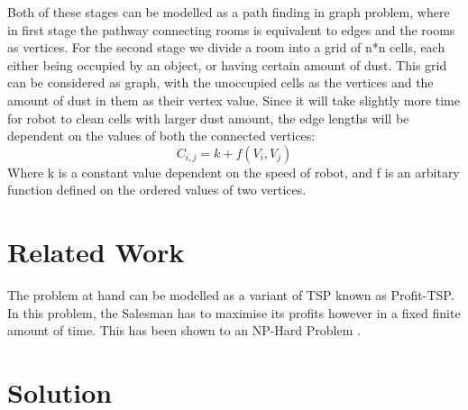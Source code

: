 \documentclass{article}
\newcommand{\Ait}{\ensuremath{A_{i \rightarrow t}}}
\newcommand{\Ati}{\ensuremath{A_{t \rightarrow i}}}
\newcommand{\Eti}{\ensuremath{E_{t \rightarrow i}}}
\newcommand{\Dti}{\ensuremath{D_{t \rightarrow i}}}
\newcommand{\Dtr}{\ensuremath{D^{(tr)}}}
\newcommand{\Dval}{\ensuremath{D^{(val)}}}
\newcommand{\TsoA}{\ensuremath{T^*(\Ati, \Ait)}}
\newcommand{\Ov}{\ensuremath{O_{i \rightarrow t}}}
\newcommand{\OsoA}{\ensuremath{\Ov^*(\Ait)}}
\newcommand{\Pv}{\ensuremath{P_{i \rightarrow t}}}
\newcommand{\PsoA}{\ensuremath{\Pv^*(\Ait)}}
\newcommand{\Gv}{\ensuremath{G_{t \rightarrow i}}}
\newcommand{\GsoA}{\ensuremath{\Gv^*(\Ati)}}
\begin{document}
Both of these stages can be modelled as a path finding in graph problem, where in first stage the pathway connecting rooms is equivalent to edges and the rooms as vertices.
For the second stage we divide a room into a grid of n*n cells, each either being occupied by an object, or having certain amount of dust. This grid can be considered as graph,
with the unoccupied cells as the vertices and the amount of dust in them as their vertex value. Since it will take slightly more time for robot to clean cells with larger dust amount,
the edge lengths will be dependent on the values of both the connected vertices:
\begin{equation}
    C_{i,j} = k + f(V_i,V_j)
\end{equation}
Where k is a constant value dependent on the speed of robot, and f is an arbitary function defined on the ordered values of two vertices.




\section{Related Work}

The problem at hand can be modelled as a variant of TSP known as Profit-TSP. In this problem,
the Salesman has to maximise its profits however in a fixed finite amount of time. 
This has been shown to an NP-Hard Problem \cite{ref1}. 


\section{Solution}
\end{document}
